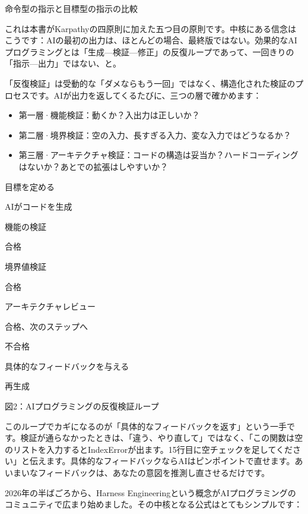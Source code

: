 \begin{center}\small\color{gray}命令型の指示と目標型の指示の比較\end{center}


これは本書がKarpathyの四原則に加えた五つ目の原則です。中核にある信念はこうです：AIの最初の出力は、ほとんどの場合、最終版ではない。効果的なAIプログラミングとは「生成—検証—修正」の反復ループであって、一回きりの「指示—出力」ではない、と。

「反復検証」は受動的な「ダメならもう一回」ではなく、構造化された検証のプロセスです。AIが出力を返してくるたびに、三つの層で確かめます：

\begin{itemize}
  \item 第一層·機能検証：動くか？入出力は正しいか？
  \item 第二層·境界検証：空の入力、長すぎる入力、変な入力ではどうなるか？
  \item 第三層·アーキテクチャ検証：コードの構造は妥当か？ハードコーディングはないか？あとでの拡張はしやすいか？
\end{itemize}

目標を定める

AIがコードを生成

機能の検証

合格

境界値検証

合格

アーキテクチャレビュー

合格、次のステップへ

不合格

具体的なフィードバックを与える

再生成

\begin{center}\small\color{gray}図2：AIプログラミングの反復検証ループ\end{center}

このループでカギになるのが「具体的なフィードバックを返す」という一手です。検証が通らなかったときは、「違う、やり直して」ではなく、「この関数は空のリストを入力するとIndexErrorが出ます。15行目に空チェックを足してください」と伝えます。具体的なフィードバックならAIはピンポイントで直せます。あいまいなフィードバックは、あなたの意図を推測し直させるだけです。


2026年の半ばごろから、Harness Engineeringという概念がAIプログラミングのコミュニティで広まり始めました。その中核となる公式はとてもシンプルです：

